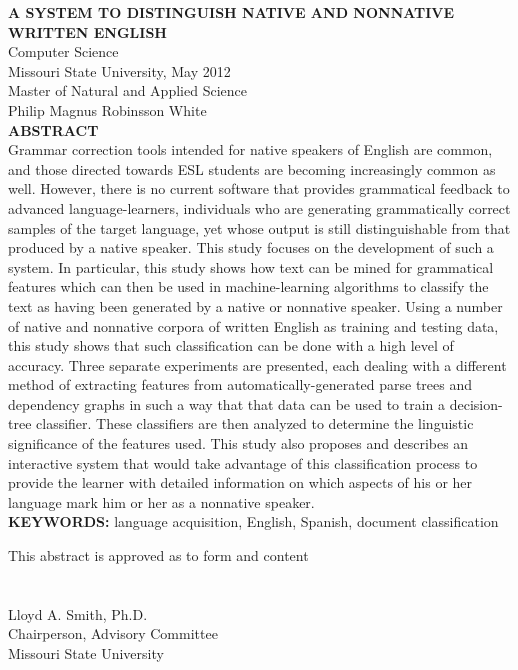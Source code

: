 \documentclass[main.tex]{subfiles}
\begin{document}
\noindent\textbf{A SYSTEM TO DISTINGUISH NATIVE AND NONNATIVE WRITTEN ENGLISH}\\
\noindent Computer Science\\
\noindent Missouri State University, May 2012\\
\noindent Master of Natural and Applied Science\\
\noindent Philip Magnus Robinsson White\\
\null
\noindent\textbf{ABSTRACT}\\
\singlespacing
\noindent Grammar correction tools intended for native speakers of English are common, and those directed towards ESL students are becoming increasingly common as well. However, there is no current software that provides grammatical feedback to advanced language-learners, individuals who are generating grammatically correct samples of the target language, yet whose output is still distinguishable from that produced by a native speaker. This study focuses on the development of such a system. In particular, this study shows how text can be mined for grammatical features which can then be used in machine-learning algorithms to classify the text as having been generated by a native or nonnative speaker. Using a number of native and nonnative corpora of written English as training and testing data, this study shows that such classification can be done with a high level of accuracy. Three separate experiments are presented, each dealing with a different method of extracting features from automatically-generated parse trees and dependency graphs in such a way that that data can be used to train a decision-tree classifier. These classifiers are then analyzed to determine the linguistic significance of the features used. This study also proposes and describes an interactive system that would take advantage of this classification process to provide the learner with detailed information on which aspects of his or her language mark him or her as a nonnative speaker.\\
\null
\noindent \textbf{KEYWORDS:} language acquisition, English, Spanish, document classification\\
\null
\raggedleft
\begin{minipage}[b]{3.5in}
This abstract is approved as to form and content\\\\

\makebox[3.5in]{\hrulefill}\\
Lloyd A. Smith, Ph.D.\\
Chairperson, Advisory Committee\\
Missouri State University
\end{minipage}
\end{document}
